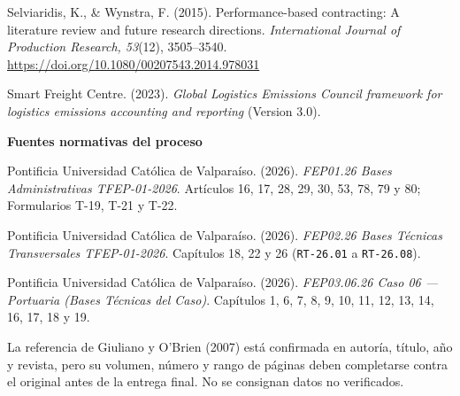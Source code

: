 \begin{list}{}{\leftmargin=1.2cm\itemindent=-1.2cm\itemsep=5pt}
  \item Selviaridis, K., \& Wynstra, F. (2015). Performance-based contracting:
    A literature review and future research directions. \emph{International
    Journal of Production Research, 53}(12), 3505--3540.
    \url{https://doi.org/10.1080/00207543.2014.978031}

  \item Smart Freight Centre. (2023). \emph{Global Logistics Emissions Council
    framework for logistics emissions accounting and reporting} (Version 3.0).
\end{list}

\vspace{10pt}
\noindent\textbf{\small Fuentes normativas del proceso}

\vspace{4pt}
\begin{list}{}{\leftmargin=1.2cm\itemindent=-1.2cm\itemsep=5pt}
  \item Pontificia Universidad Católica de Valparaíso. (2026).
    \emph{FEP01.26 Bases Administrativas TFEP-01-2026}. Artículos
    16\textdegree{}, 17\textdegree{}, 28\textdegree{}, 29\textdegree{},
    30\textdegree{}, 53\textdegree{}, 78\textdegree{}, 79\textdegree{} y
    80\textdegree{}; Formularios T-19, T-21 y T-22.
  \item Pontificia Universidad Católica de Valparaíso. (2026).
    \emph{FEP02.26 Bases Técnicas Transversales TFEP-01-2026}. Capítulos 18,
    22 y 26 (\texttt{RT-26.01} a \texttt{RT-26.08}).
  \item Pontificia Universidad Católica de Valparaíso. (2026).
    \emph{FEP03.06.26 Caso 06 --- Portuaria (Bases Técnicas del Caso)}.
    Capítulos 1, 6, 7, 8, 9, 10, 11, 12, 13, 14, 16, 17, 18 y 19.
\end{list}

\vspace{8pt}
\begin{bloqueDuda}
La referencia de Giuliano y O'Brien (2007) está confirmada en autoría, título,
año y revista, pero su volumen, número y rango de páginas deben completarse
contra el original antes de la entrega final. No se consignan datos no
verificados.
\end{bloqueDuda}
